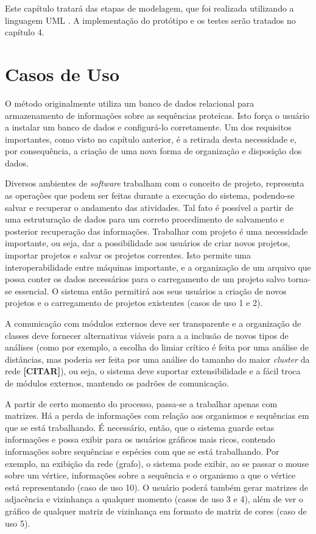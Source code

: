 Este capítulo tratará das etapas de modelagem, que foi realizada utilizando a linguagem UML \cite{uml}. A implementação do protótipo e os testes serão
tratados no capítulo 4.

\section{Casos de Uso} \label{sec:escopo}

O método originalmente utiliza um banco de dados relacional para armazenamento de informações sobre as sequências proteicas. Isto força o usuário a instalar
um banco de dados e configurá-lo corretamente. Um dos requisitos importantes, como visto no capítulo anterior, é a retirada desta necessidade e,
por consequência, a criação de uma nova forma de organização e disposição dos dados.

Diversos ambientes de \textit{software} trabalham com o conceito de projeto, representa as operações que podem ser feitas durante a execução do sistema,
podendo-se salvar e recuperar o andamento das atividades. Tal fato é possível a partir de uma estruturação de dados para um correto procedimento de
salvamento e posterior recuperação das informações. Trabalhar com projeto é uma necessidade importante, ou seja, dar a possibilidade aos usuários de criar
novos projetos, importar projetos e salvar os projetos correntes. Isto permite uma interoperabilidade entre máquinas importante, e a organização de um arquivo
que possa conter os dados necessários para o carregamento de um projeto salvo torna-se essencial. O sistema então permitirá aos seus usuários a criação de
novos projetos e o carregamento de projetos existentes (casos de uso 1 e 2).

A comunicação com módulos externos deve ser transparente e a organização de classes deve fornecer alternativas viáveis para a a inclusão de novos
tipos de análises (como por exemplo, a escolha do limiar crítico é feita por uma análise de distâncias, mas poderia ser feita por uma análise do tamanho
do maior \textit{cluster} da rede \textbf{[CITAR]}), ou seja, o sistema deve suportar extensibilidade e a fácil troca de módulos externos, mantendo
os padrões de comunicação.

A partir de certo momento do processo, passa-se a trabalhar apenas com matrizes. Há a perda de informações com relação aos organismos e sequências em que
se está trabalhando. É necessário, então, que o sistema guarde estas informações e possa exibir para os usuários gráficos mais ricos, contendo informações
sobre sequências e espécies com que se está trabalhando. Por exemplo, na exibição da rede (grafo), o sistema pode exibir, ao se passar o mouse sobre um vértice,
informações sobre a sequência e o organismo a que o vértice está representando (caso de uso 10). O usuário poderá também gerar matrizes de adjacência e
vizinhança a qualquer momento (casos de uso 3 e 4), além de ver o gráfico de qualquer matriz de vizinhança em formato de matriz de cores (caso de uso 5).


